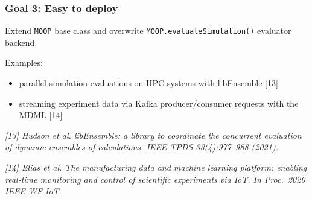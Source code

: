 \documentclass[aspectratio=169]{beamer}
\begin{document}
\begin{frame}\frametitle{Goal 3: Easy to deploy}

Extend {\tt MOOP} base class and overwrite {\tt MOOP.evaluateSimulation()}
evaluator backend.

\bigskip

Examples:
\begin{itemize}
\item parallel simulation evaluations on HPC systems with libEnsemble [13]
\item streaming experiment data via Kafka producer/consumer requests with the MDML [14]
\end{itemize}

\vfill

{\tiny\it
[13] Hudson et al.
libEnsemble: a library to coordinate the concurrent evaluation of dynamic ensembles of calculations.
IEEE TPDS 33(4):977--988 (2021).\\
}

\medskip

{\tiny\it
[14] Elias et al.
The manufacturing data and machine learning platform: enabling real-time monitoring and control of scientific experiments via IoT.
In Proc.\ 2020 IEEE WF-IoT.\\
}

\end{frame}
\end{document}
